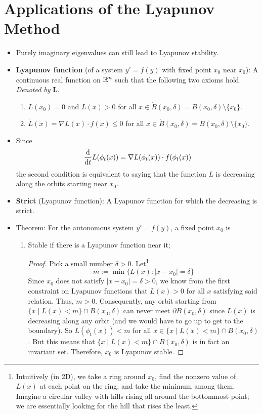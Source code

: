 \documentclass[../notes.tex]{subfiles}
\begin{document}
\section{Applications of the Lyapunov Method}
\begin{itemize}
    \item {}Purely imaginary eigenvalues can still lead to Lyapunov stability.
    \item \textbf{Lyapunov function} (of a system $y'=f(y)$ with fixed point $x_0$ near $x_0$): A continuous real function on $\mathbb{R}^n$ such that the following two axioms hold. \emph{Denoted by} $\bm{L}$.
    \begin{enumerate}
        \item $L(x_0)=0$ and $L(x)>0$ for all $x\in\mathring{B}(x_0,\delta)=B(x_0,\delta)\setminus\{x_0\}$.
        \item $\dot{L}(x)=\nabla L(x)\cdot f(x)\leq 0$ for all $x\in\mathring{B}(x_0,\delta)=B(x_0,\delta)\setminus\{x_0\}$.
    \end{enumerate}
    \item Since
    \begin{equation*}
        \dv{t}L(\phi_t(x)) = \nabla L(\phi_t(x))\cdot f(\phi_t(x))
    \end{equation*}
    the second condition is equivalent to saying that the function $L$ is decreasing along the orbits starting near $x_0$.
    \item \textbf{Strict} (Lyapunov function): A Lyapunov function for which the decreasing is strict.
    \item Theorem: For the autonomous system $y'=f(y)$, a fixed point $x_0$ is
    \begin{enumerate}
        \item Stable if there is a Lyapunov function near it;
        \begin{proof}
            Pick a small number $\delta>0$. Let\footnote{Intuitively (in 2D), we take a ring around $x_0$, find the nonzero value of $L(x)$ at each point on the ring, and take the minimum among them. Imagine a circular valley with hills rising all around the bottommost point; we are essentially looking for the hill that rises the least.}
            \begin{equation*}
                m := \min\{L(x):|x-x_0|=\delta\}
            \end{equation*}
            Since $x_0$ does not satisfy $|x-x_0|=\delta>0$, we know from the first constraint on Lyapunov functions that $L(x)>0$ for all $x$ satisfying said relation. Thus, $m>0$. Consequently, any orbit starting from $\{x\mid L(x)<m\}\cap B(x_0,\delta)$ can never meet $\partial B(x_0,\delta)$ since $L(x)$ is decreasing along any orbit (and we would have to go up to get to the boundary). So $L(\phi_t(x))<m$ for all $x\in\{x\mid L(x)<m\}\cap B(x_0,\delta)$. But this means that $\{x\mid L(x)<m\}\cap B(x_0,\delta)$ is in fact an invariant set. Therefore, $x_0$ is Lyapunov stable.

\end{proof}
\end{enumerate}
\end{itemize}
\end{document}
